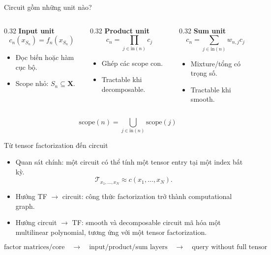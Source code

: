 \begin{frame}{Circuit gồm những unit nào?}
\small
\begin{columns}[T,totalwidth=\textwidth]
    \begin{column}{0.32\textwidth}
        \textbf{Input unit}
        \[
            c_n(x_{S_n})=f_n(x_{S_n})
        \]
        \begin{itemize}
            \item Đọc biến hoặc hàm cục bộ.
            \item Scope nhỏ: $S_n\subseteq\mathbf{X}$.
        \end{itemize}
    \end{column}
    \begin{column}{0.32\textwidth}
        \textbf{Product unit}
        \[
            c_n=\prod_{j\in\mathrm{in}(n)}c_j
        \]
        \begin{itemize}
            \item Ghép các scope con.
            \item Tractable khi decomposable.
        \end{itemize}
    \end{column}
    \begin{column}{0.32\textwidth}
        \textbf{Sum unit}
        \[
            c_n=\sum_{j\in\mathrm{in}(n)}w_{n,j}c_j
        \]
        \begin{itemize}
            \item Mixture/tổng có trọng số.
            \item Tractable khi smooth.
        \end{itemize}
    \end{column}
\end{columns}
\[
    \mathrm{scope}(n)=\bigcup_{j\in\mathrm{in}(n)}\mathrm{scope}(j)
\]
\end{frame}

\begin{frame}{Từ tensor factorization đến circuit}
\small
\begin{itemize}
    \item Quan sát chính: một circuit có thể tính một tensor entry tại một index bất kỳ.
    \[
        \mathcal{T}_{x_1,\ldots,x_N}\approx c(x_1,\ldots,x_N).
    \]
    \item Hướng TF $\to$ circuit: công thức factorization trở thành computational graph.
    \item Hướng circuit $\to$ TF: smooth và decomposable circuit mã hóa một multilinear polynomial, tương ứng với một tensor factorization.
\end{itemize}
\[
    \text{factor matrices/core}
    \quad\longrightarrow\quad
    \text{input/product/sum layers}
    \quad\longrightarrow\quad
    \text{query without full tensor}
\]
\end{frame}

